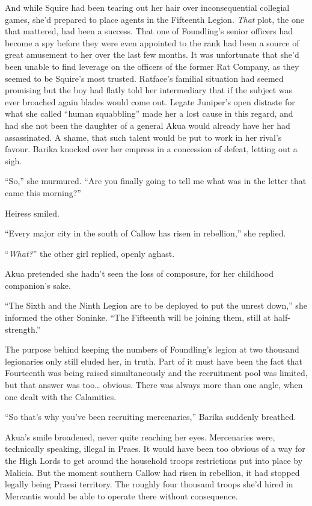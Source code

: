 \documentclass[12pt, openany]{book}
\begin{document}
And while Squire had been tearing out her hair over inconsequential collegial games, she’d prepared to place agents in the Fifteenth Legion. \textit{That} plot, the one that mattered, had been a success. That one of Foundling’s senior officers had become a spy before they were even appointed to the rank had been a source of great amusement to her over the last few months. It was unfortunate that she’d been unable to find leverage on the officers of the former Rat Company, as they seemed to be Squire’s most trusted. Ratface’s familial situation had seemed promising but the boy had flatly told her intermediary that if the subject was ever broached again blades would come out. Legate Juniper’s open distaste for what she called “human squabbling” made her a lost cause in this regard, and had she not been the daughter of a general Akua would already have her had assassinated. A shame, that such talent would be put to work in her rival’s favour. Barika knocked over her empress in a concession of defeat, letting out a sigh.

“So,” she murmured. “Are you finally going to tell me what was in the letter that came this morning?”

Heiress smiled.

“Every major city in the south of Callow has risen in rebellion,” she replied.

“\textit{What?}” the other girl replied, openly aghast.

Akua pretended she hadn’t seen the loss of composure, for her childhood companion’s sake.

“The Sixth and the Ninth Legion are to be deployed to put the unrest down,” she informed the other Soninke. “The Fifteenth will be joining them, still at half-strength.”

The purpose behind keeping the numbers of Foundling’s legion at two thousand legionaries only still eluded her, in truth. Part of it must have been the fact that Fourteenth was being raised simultaneously and the recruitment pool was limited, but that answer was too… obvious. There was always more than one angle, when one dealt with the Calamities.

“So that’s why you’ve been recruiting mercenaries,” Barika suddenly breathed.

Akua’s smile broadened, never quite reaching her eyes. Mercenaries were, technically speaking, illegal in Praes. It would have been too obvious of a way for the High Lords to get around the household troops restrictions put into place by Malicia. But the moment southern Callow had risen in rebellion, it had stopped legally being Praesi territory. The roughly four thousand troops she’d hired in Mercantis would be able to operate there without consequence.
\end{document}
